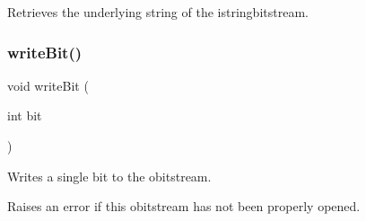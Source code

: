 Retrieves the underlying string of the istringbitstream. 

\mbox{\label{classobitstream_a487c88ba2560a4657d18c3edb7d9d247}} 
\subsubsection{\texorpdfstring{write\+Bit()}{writeBit()}}
{\footnotesize\ttfamily void write\+Bit (\begin{DoxyParamCaption}\item[{int}]{bit }\end{DoxyParamCaption})\hspace{0.3cm}{\ttfamily [inherited]}}



Writes a single bit to the obitstream. 

Raises an error if this obitstream has not been properly opened. 